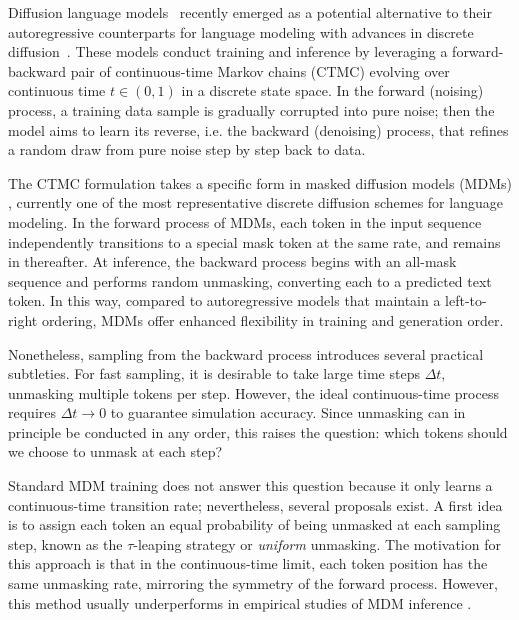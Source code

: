 Diffusion language models~\citep{nie2025large,ye2025dream7bdiffusionlarge,gong2025diffucoderunderstandingimprovingmasked,song2025seeddiffusionlargescalediffusion} recently emerged as a potential alternative to their autoregressive counterparts for language modeling with advances in discrete diffusion~\citep{austin2021structured, lou2024discrete, sahoo2024simple,shi2024simplified,ou2024your}. These models conduct training and inference by leveraging a forward-backward pair of continuous-time Markov chains (CTMC) evolving over continuous time $t\in(0,1)$ in a discrete state space. In the forward (noising) process, a training data sample is gradually corrupted into pure noise; then the model aims to learn its reverse, i.e. the backward (denoising) process, that refines a random draw from pure noise step by step back to data.

The CTMC formulation takes a specific form in masked diffusion models (MDMs) \citep{shi2024simplified,sahoo2024simple}, currently one of the most representative discrete diffusion schemes for language modeling. In the forward process of MDMs, each token in the input sequence independently transitions to a special mask token \mask{} at the same rate, and remains in \mask{} thereafter. At inference, the backward process begins with an all-mask sequence and performs random unmasking, converting each \mask{} to a predicted text token. In this way, compared to autoregressive models that maintain a left-to-right ordering, MDMs offer enhanced flexibility in training and generation order.

Nonetheless, sampling from the backward process introduces several practical subtleties. For fast sampling, it is desirable to take large time steps $\Delta t$, unmasking multiple tokens per step. However, the ideal continuous-time process requires $\Delta t \to 0$ to guarantee simulation accuracy. Since unmasking can in principle be conducted in any order, this raises the question: which tokens should we choose to unmask at each step?

Standard MDM training does not answer this question because it only learns a continuous-time transition rate; nevertheless, several proposals exist. A first idea is to assign each token an equal probability of being unmasked at each sampling step, known as the $\tau$-leaping strategy \citep{campbell2022continuous} or \textit{uniform} unmasking. The motivation for this approach is that in the continuous-time limit, each token position has the same unmasking rate, mirroring the symmetry of the forward process. However, this method 
usually underperforms in empirical studies of MDM inference \citep{zhao2024informed}.

